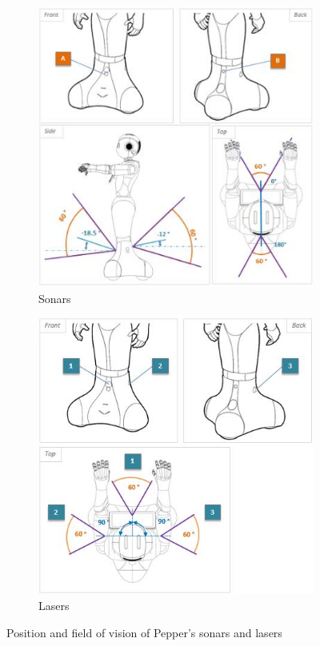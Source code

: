 \begin{figure}[H]
\centering
\begin{subfigure}{.48\textwidth}
  \centering
  \includegraphics[width=\linewidth]{Figures/Pepper_Robot/sonars.jpg}
  \caption{Sonars}
  \label{fig:sonars}
\end{subfigure}\hspace*{\fill}
\begin{subfigure}{.48\textwidth}
  \centering
  \includegraphics[width=\linewidth]{Figures/Pepper_Robot/lasers.jpg}
  \caption{Lasers}
  \label{fig:lasers}
\end{subfigure}
\caption{Position and field of vision of Pepper's sonars and lasers}
\label{fig:sonars_lasers}
\end{figure}

